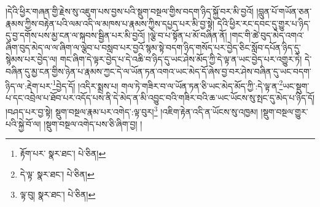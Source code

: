 །དེའི་ཕྱིར་གཞན་གྱི་རྗེས་སུ་འཇུག་པས་བྱས་པའི་སྡུག་བསྔལ་གྱིས་བདག་ཉིད་སྐྱོ་བར་མི་བྱའོ། །བླུན་པོ་གཡོན་ཅན་རྣམས་ཀྱིས་བརྟེན་པའི་ལམ་འདི་ལ་མཁས་པ་རྣམས་ཀྱིས་དཔྱད་པར་མི་བྱ་སྟེ། དེའི་ཕྱིར་རང་དབང་དུ་གྱུར་པ་ཉིད་དུ་བྱ་དགོས་པས་མྱ་ངན་ལ་སྐབས་སྦྱིན་པར་མི་བྱའོ། །ལྕེ་བ་པ་སྟོན་པ་མོ་བཞིན་ནོ། །གང་གི་ཚེ་བུད་མེད་འགའ་ཞིག་བུད་མེད་ལ་ལ་ཞིག་ལ་ལྕེབ་པ་བསླབ་པར་བྱའོ་སྙམ་སྟེ་བདག་ཉིད་གསོད་པར་བྱེད་ཅིང་སློབ་དཔོན་ཉིད་དུ་སྙེམས་པར་བྱེད་ལ། གང་ཞིག་དེ་ལྟར་བྱེད་པ་དེ་འཆི་བ་ཉིད་དུ་ཡང་ཤེས་མོད་ཀྱི་དེ་ལྟ་ན་ཡང་བྱེད་པར་འགྱུར་ཏེ། དེ་བཞིན་དུ་མྱ་ངན་གྱིས་ཉེན་པ་རྣམས་ཀྱང་དེ་ལ་ཡོན་ཏན་འགའ་ཡང་མེད་དོ་ཞེས་བྱ་བར་ཤེས་བཞིན་དུ་ཡང་བདག་ཉིད་ལ་:རྡེག་པར་\footnote{རྟོག་པར་  སྣར་ཐང་།  པེ་ཅིན། }བྱེད་དོ། །འདིར་སྨྲས་པ། གལ་ཏེ་གཟིར་བ་ལ་ཡོན་ཏན་ཅི་ཡང་མེད་མོད་ཀྱི་:དེ་ལྟ་ན་\footnote{དེ་ལྟ་  སྣར་ཐང་།  པེ་ཅིན། }ཡང་སྡུག་པ་དང་འབྲེལ་པ་ཐོབ་པར་འདོད་པས་ནི་དེ་མེད་ན་མི་འབྱུང་བའི་གཟིར་བའི་ཆ་ཡང་ཡོངས་སུ་སྤང་དུ་མེད་པ་ཉིད་དོ། །བཤད་པར་བྱ་སྟེ། སྡུག་བསྔལ་རྣམ་པར་འགེད་:ལྟ་བུར།\footnote{ལྟ་བུ།  སྣར་ཐང་།  པེ་ཅིན། } །འཇིག་རྟེན་འདི་ན་ཡོངས་སུ་འཁྱམ། །སྡུག་བསྔལ་གྱུར་པའི་སྐྱེ་བོ་ལ། །སྡུག་བསྔལ་འགེད་པས་ཅི་ཞིག་བྱ། །
